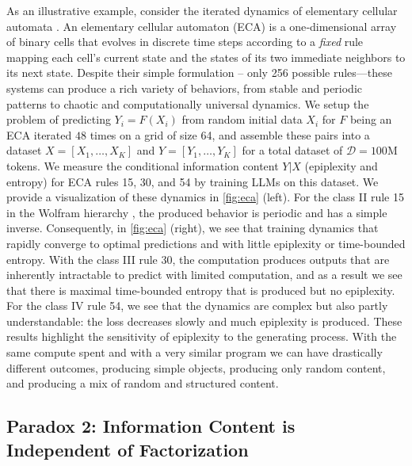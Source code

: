 \documentclass[twoside]{article}
\newcommand{\D}{\mathcal{D}}
\begin{document}
As an illustrative example, consider the iterated dynamics of elementary cellular automata \citep{wolfram2003new,zhang2024intelligence}. An elementary cellular automaton (ECA) is a one‑dimensional array of binary cells that evolves in discrete time steps according to a \emph{fixed} rule mapping each cell’s current state and the states of its two immediate neighbors to its next state. Despite their simple formulation -- only 256 possible rules---these systems can produce a rich variety of behaviors, from stable and periodic patterns to chaotic and computationally universal dynamics. We setup the problem of predicting $Y_i=F(X_i)$ from random initial data $X_i$ for $F$ being an ECA iterated $48$ times on a grid of size 64, and assemble these pairs into a dataset $X=[X_1,\dots,X_K]$ and $Y=[Y_1,\dots,Y_K]$ for a total dataset of $\D=100$M tokens. %
%
We measure the conditional information content $Y|X$ (epiplexity and entropy) for ECA rules 15, 30, and 54 by training LLMs on this dataset. We provide a visualization of these dynamics in \autoref{fig:eca} (left). For the class II rule 15 in the Wolfram hierarchy \citep{wolfram2003new}, the produced behavior is periodic and has a simple inverse. Consequently, in \autoref{fig:eca} (right), we see that training dynamics that rapidly converge to optimal predictions and with little epiplexity or time-bounded entropy. With the class III rule 30, the computation produces outputs that are inherently intractable to predict with limited computation, and as a result we see that there is maximal time-bounded entropy that is produced but no epiplexity. For the class IV rule 54, we see that the dynamics are complex but also partly understandable: the loss decreases slowly and much epiplexity is produced. These results highlight the sensitivity of epiplexity to the generating process. With the same compute spent and with a very similar program we can have drastically different outcomes, producing simple objects, producing only random content, and producing a mix of random and structured content.
%
%
%

%

%
%
%
%
%
%
%

%
%
%
%
%
%
%
%
%
%
%
%
%
%
%
%
%
%




\subsection{Paradox 2: Information Content is Independent of Factorization}
\label{sec:factorization}
%
%
%
%
%
%
\end{document}
